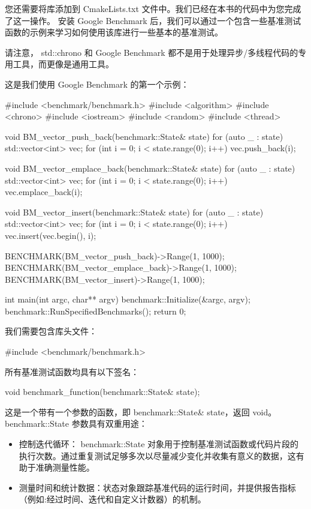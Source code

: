 您还需要将库添加到 CmakeLists.txt 文件中。我们已经在本书的代码中为您完成了这一操作。
安装 Google Benchmark 后，我们可以通过一个包含一些基准测试函数的示例来学习如何使用该库进行一些基本的基准测试。

请注意， std::chrono 和 Google Benchmark 都不是用于处理异步/多线程代码的专用工具，而更像是通用工具。

这是我们使用 Google Benchmark 的第一个示例：

\begin{cpp}
#include <benchmark/benchmark.h>
#include <algorithm>
#include <chrono>
#include <iostream>
#include <random>
#include <thread>

void BM_vector_push_back(benchmark::State& state) {
    for (auto _ : state) {
        std::vector<int> vec;
        for (int i = 0; i < state.range(0); i++) {
            vec.push_back(i);
        }
    }
}

void BM_vector_emplace_back(benchmark::State& state) {
    for (auto _ : state) {
        std::vector<int> vec;
        for (int i = 0; i < state.range(0); i++) {
            vec.emplace_back(i);
        }
    }
}

void BM_vector_insert(benchmark::State& state) {
    for (auto _ : state) {
        std::vector<int> vec;
        for (int i = 0; i < state.range(0); i++) {
            vec.insert(vec.begin(), i);
        }
    }
}

BENCHMARK(BM_vector_push_back)->Range(1, 1000);
BENCHMARK(BM_vector_emplace_back)->Range(1, 1000);
BENCHMARK(BM_vector_insert)->Range(1, 1000);

int main(int argc, char** argv) {
    benchmark::Initialize(&argc, argv);
    benchmark::RunSpecifiedBenchmarks();
    return 0;
}
\end{cpp}

我们需要包含库头文件：

\begin{cpp}
#include <benchmark/benchmark.h>
\end{cpp}

所有基准测试函数均具有以下签名：

\begin{cpp}
void benchmark_function(benchmark::State& state);
\end{cpp}

这是一个带有一个参数的函数，即 benchmark::State\& state，返回 void。 benchmark::State 参数具有双重用途：

\begin{itemize}
\item
控制迭代循环： benchmark::State 对象用于控制基准测试函数或代码片段的执行次数。通过重复测试足够多次以尽量减少变化并收集有意义的数据，这有助于准确测量性能。

\item
测量时间和统计数据：状态对象跟踪基准代码的运行时间，并提供报告指标（例如:经过时间、迭代和自定义计数器）的机制。
\end{itemize}

